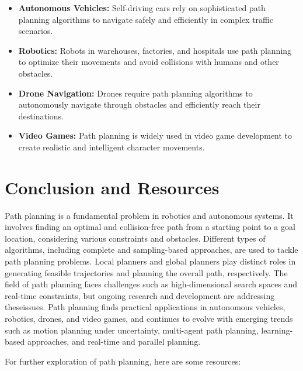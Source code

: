 \documentclass{article}
\begin{document}
\begin{itemize}
\item \textbf{Autonomous Vehicles:} Self-driving cars rely on sophisticated path planning algorithms to navigate safely and efficiently in complex traffic scenarios.
\item \textbf{Robotics:} Robots in warehouses, factories, and hospitals use path planning to optimize their movements and avoid collisions with humans and other obstacles.
\item \textbf{Drone Navigation:} Drones require path planning algorithms to autonomously navigate through obstacles and efficiently reach their destinations.
\item \textbf{Video Games:} Path planning is widely used in video game development to create realistic and intelligent character movements.
\end{itemize}

\section{Conclusion and Resources}
Path planning is a fundamental problem in robotics and autonomous systems. It involves finding an optimal and collision-free path from a starting point to a goal location, considering various constraints and obstacles. Different types of algorithms, including complete and sampling-based approaches, are used to tackle path planning problems. Local planners and global planners play distinct roles in generating feasible trajectories and planning the overall path, respectively. The field of path planning faces challenges such as high-dimensional search spaces and real-time constraints, but ongoing research and development are addressing theseissues. Path planning finds practical applications in autonomous vehicles, robotics, drones, and video games, and continues to evolve with emerging trends such as motion planning under uncertainty, multi-agent path planning, learning-based approaches, and real-time and parallel planning.

For further exploration of path planning, here are some resources:
\end{document}
